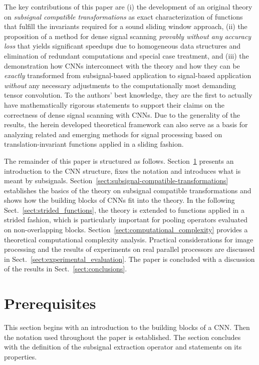 \documentclass[journal]{IEEEtran}
\begin{document}
The key contributions of this paper are
(i) the development of an original theory on \emph{subsignal compatible transformations} as exact characterization of functions that fulfill the invariants required for a sound sliding window approach,
(ii) the proposition of a method for dense signal scanning \emph{provably without any accuracy loss} that yields significant speedups due to homogeneous data structures and elimination of redundant computations and special case treatment,
and (iii) the demonstration how CNNs interconnect with the theory and how they can be \emph{exactly} transformed from subsignal-based application to signal-based application \emph{without} any necessary adjustments to the computationally most demanding tensor convolution.
To the authors' best knowledge, they are the first to actually have mathematically rigorous statements to support their claims on the correctness of dense signal scanning with CNNs.
Due to the generality of the results, the herein developed theoretical framework can also serve as a basis for analyzing related and emerging methods for signal processing based on translation-invariant functions applied in a sliding fashion.

The remainder of this paper is structured as follows.
Section~\ref{sect:prerequisites} presents an introduction to the CNN structure, fixes the notation and introduces what is meant by subsignals.
Section~\ref{sect:subsignal-compatible-transformations} establishes the basics of the theory on subsignal compatible transformations and shows how the building blocks of CNNs fit into the theory.
In the following Sect.~\ref{sect:strided_functions}, the theory is extended to functions applied in a strided fashion, which is particularly important for pooling operators evaluated on non-overlapping blocks.
Section~\ref{sect:computational_complexity} provides a theoretical computational complexity analysis.
Practical considerations for image processing and the results of experiments on real parallel processors are discussed in Sect.~\ref{sect:experimental_evaluation}.
The paper is concluded with a discussion of the results in Sect.~\ref{sect:conclusions}.

\section{Prerequisites}
\label{sect:prerequisites}
This section begins with an introduction to the building blocks of a CNN.
Then the notation used throughout the paper is established.
The section concludes with the definition of the subsignal extraction operator and statements on its properties.
\end{document}
